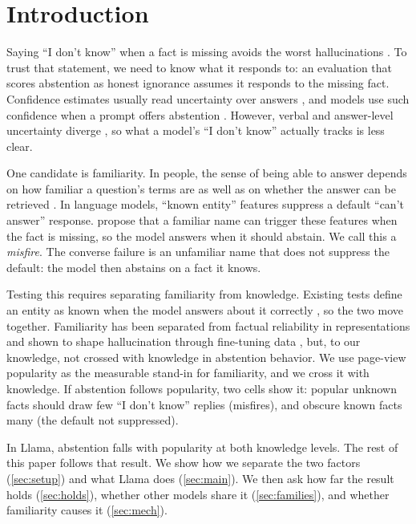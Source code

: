 \documentclass[manuscript,screen,review,anonymous,nonacm]{acmart}
\newcommand{\idk}{``I don't know''}
\begin{document}
\section{Introduction}

Saying \idk{} when a fact is missing avoids the worst hallucinations \cite{kalai2025hallucinate}. To trust that statement, we need to know what it responds to: an evaluation that scores abstention as honest ignorance assumes it responds to the missing fact. Confidence estimates usually read uncertainty over answers \cite{kadavath2022know,kuhn2023semantic,stolfo2024confidence}, and models use such confidence when a prompt offers abstention \cite{kumaran2026confidence}. However, verbal and answer-level uncertainty diverge \cite{ji2025hedging}, so what a model's \idk{} actually tracks is less clear.

One candidate is familiarity. In people, the sense of being able to answer depends on how familiar a question's terms are as well as on whether the answer can be retrieved \cite{reder1992,schwartz1992,koriat2001cascade}. In language models, ``known entity'' features suppress a default ``can't answer'' response. \citet{lindsey2025biology} propose that a familiar name can trigger these features when the fact is missing, so the model answers when it should abstain. We call this a \emph{misfire}. The converse failure is an unfamiliar name that does not suppress the default: the model then abstains on a fact it knows.

Testing this requires separating familiarity from knowledge. Existing tests define an entity as known when the model answers about it correctly \cite{ferrando2025iknow}, so the two move together. Familiarity has been separated from factual reliability in representations \cite{brzezinka2026bielik} and shown to shape hallucination through fine-tuning data \cite{kang2025unfamiliar}, but, to our knowledge, not crossed with knowledge in abstention behavior. We use page-view popularity as the measurable stand-in for familiarity, and we cross it with knowledge. If abstention follows popularity, two cells show it: popular unknown facts should draw few \idk{} replies (misfires), and obscure known facts many (the default not suppressed).

In Llama, abstention falls with popularity at both knowledge levels. The rest of this paper follows that result. We show how we separate the two factors (\cref{sec:setup}) and what Llama does (\cref{sec:main}). We then ask how far the result holds (\cref{sec:holds}), whether other models share it (\cref{sec:families}), and whether familiarity causes it (\cref{sec:mech}).
\end{document}
